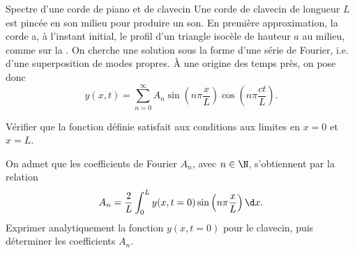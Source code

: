 \begin{exo}[PC][3][TD]{Spectre d’une corde de piano et de clavecin}
  Une corde de clavecin de longueur $L$ est pincée en son milieu pour produire un son. En première approximation, la corde a, à l’instant initial, le profil d’un triangle isocèle de hauteur $a$ au milieu, comme sur la . On cherche une solution sous la forme d’une série de Fourier, i.e. d’une superposition de modes propres. À une origine des temps près, on pose donc
  \begin{equation}
    y(x,t) = \sum_{n =0}^{\infty} A_n \sin\left(n\pi \frac{x}{L}\right) \cos\left(n\pi \frac{ct}{L}\right).
  \end{equation}


\begin{quest}
  \item	Vérifier que la fonction définie satisfait aux conditions aux limites en $x=0$ et $x=L$.
  \item On admet que les coefficients de Fourier $A_n$, avec $n\in \N$, s’obtiennent par la relation 
  \begin{equation}
    A_n = \frac{2}{L}\int_0^L y(x,t = 0)\sin\left(n\pi \frac{x}{L}\right) \d x. 
  \end{equation}
  Exprimer analytiquement la fonction $y(x,t=0)$ pour le clavecin, puis déterminer les coefficients $A_n$. 


\end{quest}
\end{exo}
